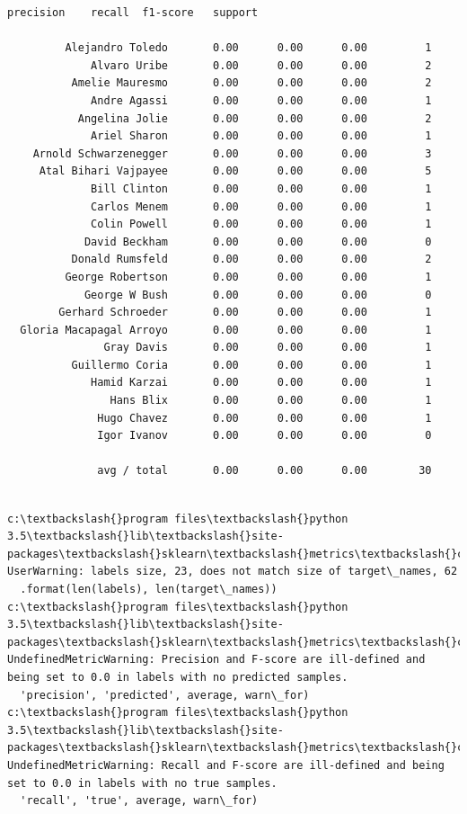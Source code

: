 \documentclass[11pt]{article}
\begin{document}
    \begin{Verbatim}[commandchars=\\\{\}]
                           precision    recall  f1-score   support

         Alejandro Toledo       0.00      0.00      0.00         1
             Alvaro Uribe       0.00      0.00      0.00         2
          Amelie Mauresmo       0.00      0.00      0.00         2
             Andre Agassi       0.00      0.00      0.00         1
           Angelina Jolie       0.00      0.00      0.00         2
             Ariel Sharon       0.00      0.00      0.00         1
    Arnold Schwarzenegger       0.00      0.00      0.00         3
     Atal Bihari Vajpayee       0.00      0.00      0.00         5
             Bill Clinton       0.00      0.00      0.00         1
             Carlos Menem       0.00      0.00      0.00         1
             Colin Powell       0.00      0.00      0.00         1
            David Beckham       0.00      0.00      0.00         0
          Donald Rumsfeld       0.00      0.00      0.00         2
         George Robertson       0.00      0.00      0.00         1
            George W Bush       0.00      0.00      0.00         0
        Gerhard Schroeder       0.00      0.00      0.00         1
  Gloria Macapagal Arroyo       0.00      0.00      0.00         1
               Gray Davis       0.00      0.00      0.00         1
          Guillermo Coria       0.00      0.00      0.00         1
             Hamid Karzai       0.00      0.00      0.00         1
                Hans Blix       0.00      0.00      0.00         1
              Hugo Chavez       0.00      0.00      0.00         1
              Igor Ivanov       0.00      0.00      0.00         0

              avg / total       0.00      0.00      0.00        30


    \end{Verbatim}

    \begin{Verbatim}[commandchars=\\\{\}]
c:\textbackslash{}program files\textbackslash{}python 3.5\textbackslash{}lib\textbackslash{}site-packages\textbackslash{}sklearn\textbackslash{}metrics\textbackslash{}classification.py:1428: UserWarning: labels size, 23, does not match size of target\_names, 62
  .format(len(labels), len(target\_names))
c:\textbackslash{}program files\textbackslash{}python 3.5\textbackslash{}lib\textbackslash{}site-packages\textbackslash{}sklearn\textbackslash{}metrics\textbackslash{}classification.py:1135: UndefinedMetricWarning: Precision and F-score are ill-defined and being set to 0.0 in labels with no predicted samples.
  'precision', 'predicted', average, warn\_for)
c:\textbackslash{}program files\textbackslash{}python 3.5\textbackslash{}lib\textbackslash{}site-packages\textbackslash{}sklearn\textbackslash{}metrics\textbackslash{}classification.py:1137: UndefinedMetricWarning: Recall and F-score are ill-defined and being set to 0.0 in labels with no true samples.
  'recall', 'true', average, warn\_for)

    \end{Verbatim}
\end{document}
